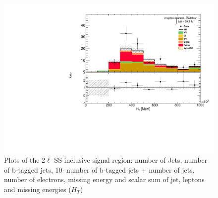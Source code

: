 \begin{figure}[!htbp]
\begin{minipage}[h]{0.5\textwidth}
    \centering \includegraphics[width=\textwidth]{figs/results/plotCand_2lep_HT}
  \end{minipage}\hfill
\caption{Plots of the 2$\ell$ SS inclusive signal region: number of Jets, number of b-tagged jets, 10$\cdot$ number of b-tagged jets + number of jets, number of electrons, missing energy and scalar sum of jet, leptons and missing energies ($H_T$) } 
\label{figure:results_2l_event}
\end{figure} 



